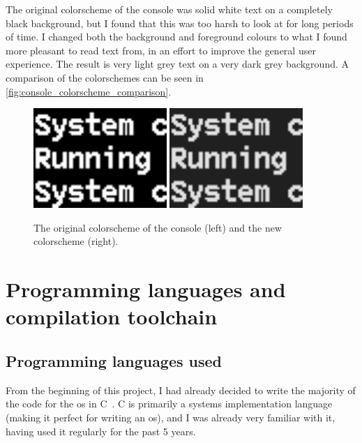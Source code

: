 \documentclass{article}
\begin{document}
The original colorscheme of the console was solid white text on a completely
black background, but I found that this was too harsh to look at for long
periods of time. I changed both the background and foreground colours to what I
found more pleasant to read text from, in an effort to improve the general user
experience. The result is very light grey text on a very dark grey background.
A comparison of the colorschemes can be seen in
\autoref{fig:console_colorscheme_comparison}.

\begin{figure}[htpb]
    \centering
    \includegraphics[width=0.45\textwidth]{figure/black.png}
    \includegraphics[width=0.45\textwidth]{figure/grey.png}
    \caption{The original colorscheme of the console (left) and the new
    colorscheme (right).}
    \label{fig:console_colorscheme_comparison}
\end{figure}

\section{Programming languages and compilation toolchain}
\subsection{Programming languages used}
From the beginning of this project, I had already decided to write the majority
of the code for the \gls{os} in C~\cite{c-programming-language}. C is primarily
a systems implementation language (making it perfect for writing an \gls{os}),
and I was already very familiar with it, having used it regularly for the past
5 years.
\end{document}

